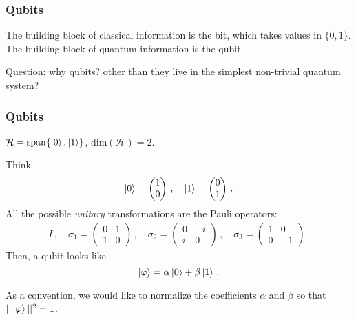 \documentclass[12pt]{beamer}
\begin{document}
\begin{frame}
    \frametitle{Qubits}
    The building block of classical information is the bit, which takes values in 
    $\{0,1\}$.
    The building block of quantum information is the qubit.

    \pause

    Question: why qubits? other than they live in the simplest non-trivial quantum system?

\end{frame}

\begin{frame}
    \frametitle{Qubits}
    $\mathcal{H} = \mathrm{span}\{\ket{0}, \ket{1}\}$,
    $\mathrm{dim}(\mathcal{H}) = 2$.

    Think 
    \begin{equation*}
        \ket{0} = \begin{pmatrix}
            1 \\ 0
        \end{pmatrix} \,, \quad 
            \ket{1} =
        \begin{pmatrix}
            0 \\1 
        \end{pmatrix}\,.
    \end{equation*}
    All the possible \emph{unitary} transformations are the Pauli operators:
    \begin{gather*}
        I \,, \quad \sigma_1 = \begin{pmatrix}
            0 & 1 \\ 1 & 0
        \end{pmatrix} \,,
        \quad \sigma_2 = \begin{pmatrix}
            0 & -i \\ i & 0
        \end{pmatrix} \,,
        \quad \sigma_3 = \begin{pmatrix}
            1 & 0 \\ 0 &-1 
        \end{pmatrix} \,.
    \end{gather*}
    Then, a qubit looks like
    \begin{equation*}
        \ket{\varphi} = \alpha \ket{0} + \beta \ket{1} \,.
    \end{equation*}

    As a convention, we would like to normalize the coefficients $\alpha$ and $\beta$
    so that $|| \ket{\varphi} ||^2 = 1$.
     
\end{frame}
\end{document}
